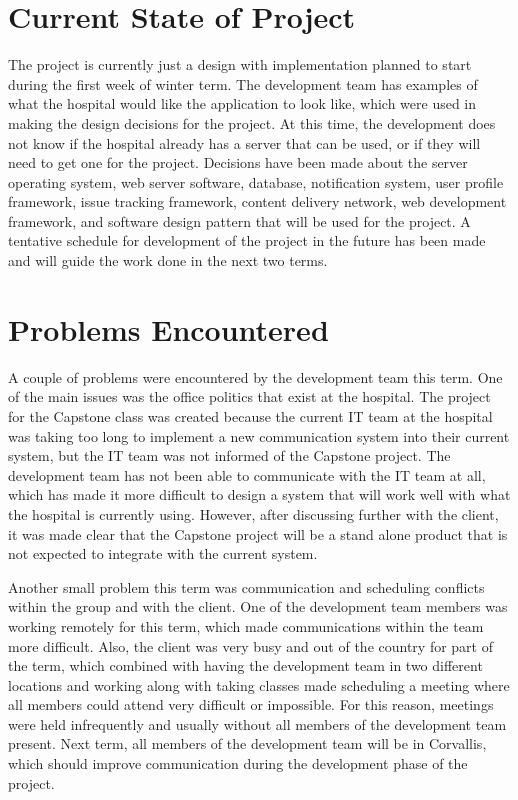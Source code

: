 \documentclass[onecolumn, draftclsnofoot,10pt, compsoc]{IEEEtran}
\begin{document}
\section{Current State of Project}
The project is currently just a design with implementation planned to start during the first week of winter term. The development team has examples of what the hospital would like the application to look like, which were used in making the design decisions for the project. At this time, the development does not know if the hospital already has a server that can be used, or if they will need to get one for the project. Decisions have been made about the server operating system, web server software, database, notification system, user profile framework, issue tracking framework, content delivery network, web development framework, and software design pattern that will be used for the project. A tentative schedule for development of the project in the future has been made and will guide the work done in the next two terms.

\section{Problems Encountered}
A couple of problems were encountered by the development team this term. One of the main issues was the office politics that exist at the hospital. The project for the Capstone class was created because the current IT team at the hospital was taking too long to implement a new communication system into their current system, but the IT team was not informed of the Capstone project. The development team has not been able to communicate with the IT team at all, which has made it more difficult to design a system that will work well with what the hospital is currently using. However, after discussing further with the client, it was made clear that the Capstone project will be a stand alone product that is not expected to integrate with the current system.

Another small problem this term was communication and scheduling conflicts within the group and with the client. One of the development team members was working remotely for this term, which made communications within the team more difficult. Also, the client was very busy and out of the country for part of the term, which combined with having the development team in two different locations and working along with taking classes made scheduling a meeting where all members could attend very difficult or impossible. For this reason, meetings were held infrequently and usually without all members of the development team present. Next term, all members of the development team will be in Corvallis, which should improve communication during the development phase of the project.
\end{document}
